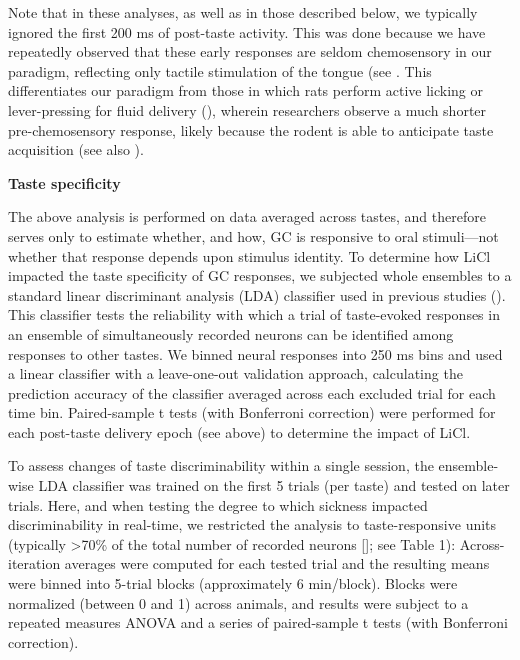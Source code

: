 \begin{refsection}
{Note that in these analyses, as well as in those described below, we typically ignored the first 200 ms of post-taste activity. This was done because we have repeatedly observed that these early responses are seldom chemosensory in our paradigm, reflecting only tactile stimulation of the tongue (see \cite{fontanini2006a,katz-a,katz2001a,sadacca2016a,sadacca2012a,jones2007a}. This differentiates our paradigm from those in which rats perform active licking or lever-pressing for fluid delivery (\cite{gutierrez2010a,stapleton2006a,graham2014a,bouaichi2020a,dikecligil2020a}), wherein researchers observe a much shorter pre-chemosensory response, likely because the rodent is able to anticipate taste acquisition (see also \cite{li2016a}).

\smallskip
\noindent\textbf{Taste specificity}\par
\noindent 
The above analysis is performed on data averaged across tastes, and therefore serves only to estimate whether, and how, GC is responsive to oral stimuli—not whether that response depends upon stimulus identity. To determine how LiCl impacted the taste specificity of GC responses, we subjected whole ensembles to a standard linear discriminant analysis (LDA) classifier used in previous studies (\cite{katz2001a,sadacca2016a,nicolelis1997a}). This classifier tests the reliability with which a trial of taste-evoked responses in an ensemble of simultaneously recorded neurons can be identified among responses to other tastes. We binned neural responses into 250 ms bins and used a linear classifier with a leave-one-out validation approach, calculating the prediction accuracy of the classifier averaged across each excluded trial for each time bin. Paired-sample t tests (with Bonferroni correction) were performed for each post-taste delivery epoch (see above) to determine the impact of LiCl.

To assess changes of taste discriminability within a single session, the ensemble-wise LDA classifier was trained on the first 5 trials (per taste) and tested on later trials. Here, and when testing the degree to which sickness impacted discriminability in real-time, we restricted the analysis to taste-responsive units (typically >70\% of the total number of recorded neurons [\cite{katz-a,katz2001a,jones2007a}]; see Table 1): Across-iteration averages were computed for each tested trial and the resulting means were binned into 5-trial blocks (approximately 6 min/block). Blocks were normalized (between 0 and 1) across animals, and results were subject to a repeated measures ANOVA and a series of paired-sample t tests (with Bonferroni correction).

}
\end{refsection}
